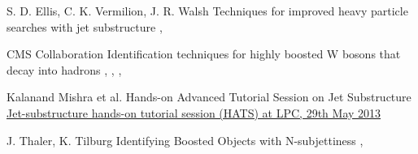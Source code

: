 {S. D. Ellis, C. K. Vermilion, J. R. Walsh}
{Techniques for improved heavy particle searches with jet substructure}
{, }

{CMS Collaboration}
{Identification techniques for highly boosted W bosons that decay into hadrons}
{, , , }

{Kalanand Mishra et al.}
{Hands-on Advanced Tutorial Session on Jet Substructure}
{\href{https://twiki.cern.ch/twiki/pub/CMSPublic/SWGuideHATSJetSubstructure/JS_HATS_intro.pdf}{Jet-substructure hands-on tutorial session (HATS) at LPC, 29th May 2013}}

{J. Thaler, K. Tilburg}
{Identifying Boosted Objects with N-subjettiness}
{, }




